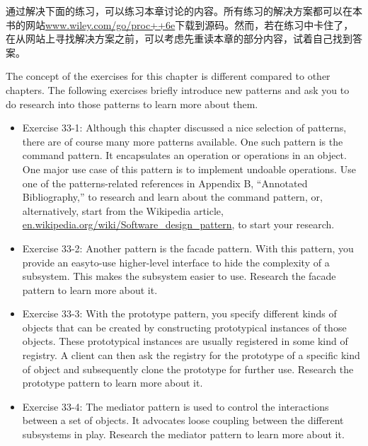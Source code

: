通过解决下面的练习，可以练习本章讨论的内容。所有练习的解决方案都可以在本书的网站\url{www.wiley.com/go/proc++6e}下载到源码。然而，若在练习中卡住了，在从网站上寻找解决方案之前，可以考虑先重读本章的部分内容，试着自己找到答案。

The concept of the exercises for this chapter is different compared to other chapters. The following exercises briefly introduce new patterns and ask you to do research into those patterns to learn more about them.

\begin{itemize}
\item
Exercise 33-1: Although this chapter discussed a nice selection of patterns, there are of course many more patterns available. One such pattern is the command pattern. It encapsulates an operation or operations in an object. One major use case of this pattern is to implement undoable operations. Use one of the patterns-related references in Appendix B, “Annotated Bibliography,” to research and learn about the command pattern, or, alternatively, start from the Wikipedia article, \url{en.wikipedia.org/wiki/Software_design_pattern}, to start your research.

\item
Exercise 33-2: Another pattern is the facade pattern. With this pattern, you provide an easyto-use higher-level interface to hide the complexity of a subsystem. This makes the subsystem easier to use. Research the facade pattern to learn more about it.

\item
Exercise 33-3: With the prototype pattern, you specify different kinds of objects that can be created by constructing prototypical instances of those objects. These prototypical instances are usually registered in some kind of registry. A client can then ask the registry for the prototype of a specific kind of object and subsequently clone the prototype for further use. Research the prototype pattern to learn more about it.

\item
Exercise 33-4: The mediator pattern is used to control the interactions between a set of objects. It advocates loose coupling between the different subsystems in play. Research the mediator pattern to learn more about it.
\end{itemize}












